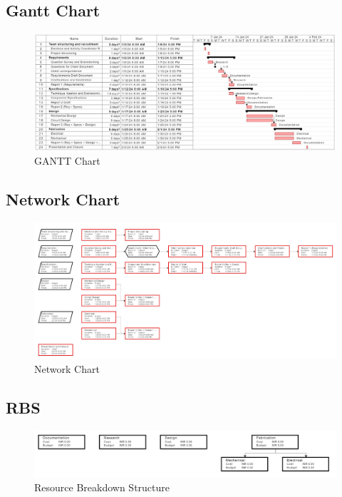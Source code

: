 \documentclass[12pt]{article}
\begin{document}
\subsection{Gantt Chart}
\begin{center}
    \begin{figure}[H]
        \centering
        \includegraphics[width=1.05\linewidth]{Images/Gantt Chart (1)_1.jpg}
        \caption{GANTT Chart}
        \label{fig:ganttchart}
    \end{figure}
\end{center}

\subsection{Network Chart}
\begin{center}
    \begin{figure}[H]
        \centering
        \includegraphics[width=1.05\linewidth]{Images/NetworkChart_1.jpg}
        \caption{Network Chart}
        \label{fig:networkchart}
    \end{figure}
\end{center}

\subsection{RBS}
\begin{center}
    \begin{figure}[H]
        \centering
        \includegraphics[width=1\linewidth]{Images/RBS_1.jpg}
        \caption{Resource Breakdown Structure}
        \label{fig:rbs}
    \end{figure}
\end{center}
\end{document}
